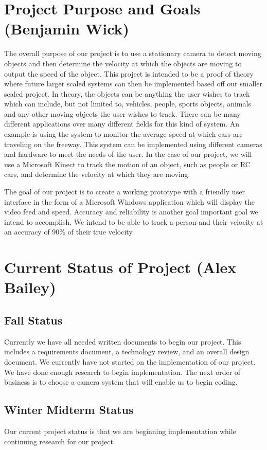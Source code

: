 \documentclass[onecolumn, draftclsnofoot,10pt, compsoc]{IEEEtran}
\begin{document}
\section{Project Purpose and Goals (Benjamin Wick)}
The overall purpose of our project is to use a stationary camera to detect moving objects and then determine the velocity at which the objects are moving to output the speed of the object.
This project is intended to be a proof of theory where future larger scaled systems can then be implemented based off our smaller scaled project.
In theory, the objects can be anything the user wishes to track which can include, but not limited to, vehicles, people, sports objects, animals and any other moving objects the user wishes to track.
There can be many different applications over many different fields for this kind of system.
An example is using the system to monitor the average speed at which cars are traveling on the freeway.
This system can be implemented using different cameras and hardware to meet the needs of the user.
In the case of our project, we will use a Microsoft Kinect to track the motion of an object, such as people or RC cars, and determine the velocity at which they are moving.

The goal of our project is to create a working prototype with a friendly user interface in the form of a Microsoft Windows application which will display the video feed and speed.
Accuracy and reliability is another goal important goal we intend to accomplish.
We intend to be able to track a person and their velocity at an accuracy of 90\% of their true velocity.

\section{Current Status of Project (Alex Bailey)}
\subsection{Fall Status}
Currently we have all needed written documents to begin our project.
This includes a requirements document, a technology review, and an overall design document.
We currently have not started on the implementation of our project.
We have done enough research to begin implementation.
The next order of business is to choose a camera system that will enable us to begin coding.

\subsection{Winter Midterm Status}
Our current project status is that we are beginning implementation while continuing research for our project.
\end{document}
